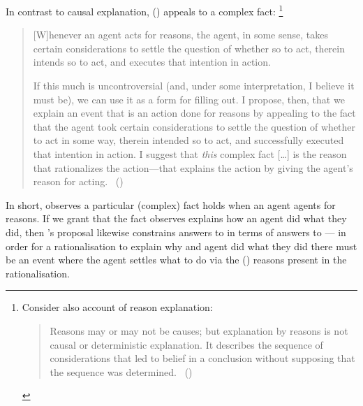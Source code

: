 \begin{note}
  In contrast to causal explanation, \citeauthor{Hieronymi:2011aa} (\citeyear{Hieronymi:2011aa}) appeals to a complex fact:%
  \footnote{
    Consider also \citeauthor{Harman:1973ww} account of reason explanation:
    \begin{quote}
      Reasons may or may not be causes; but explanation by reasons is not causal or deterministic explanation.
      It describes the sequence of considerations that led to belief in a conclusion without supposing that the sequence was determined.%
      \mbox{ }\hfill\mbox{(\citeyear[52]{Harman:1973ww})}
    \end{quote}
  }
  \begin{quote}
    [W]henever an agent acts for reasons, the agent, in some sense, takes certain considerations to settle the question of whether so to act, therein intends so to act, and executes that intention in action.

    If this much is uncontroversial (and, under some interpretation, I believe it must be), we can use it as a form for filling out.
    I propose, then, that we explain an event that is an action done for reasons by appealing to the fact that the agent took certain considerations to settle the question of whether to act in some way, therein intended so to act, and successfully executed that intention in action.
    I suggest that \emph{this} complex fact [\dots] is the reason that rationalizes the action---that explains the action by giving the agent's reason for acting.%
    \mbox{ }\hfill\mbox{(\citeyear[421]{Hieronymi:2011aa})}
  \end{quote}
  In short, \citeauthor{Hieronymi:2011aa} observes a particular (complex) fact holds when an agent agents for reasons.
  If we grant that the fact \citeauthor{Hieronymi:2011aa} observes explains how an agent did what they did, then \citeauthor{Hieronymi:2011aa}'s proposal likewise constrains answers to \qWhyR{} in terms of answers to \qHowR{} --- in order for a rationalisation to explain why and agent did what they did there must be an event where the agent settles what to do via the (\agents{}) reasons present in the rationalisation.
\end{note}

